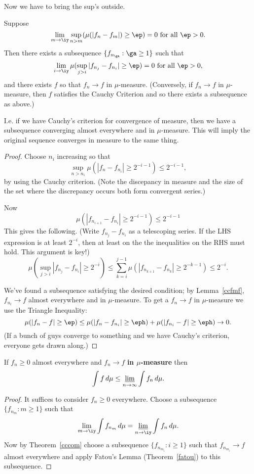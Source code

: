 Now we have to bring the sup's outside.
\begin{lem}\label{cccom}
Suppose 
\[
\lim_{m\to \iy}\sup_{n>m} (\mu(|f_n-f_m|)\ge \ep)=0\text{ for all }\ep>0.
\]
Then there exists a subsequence $\{f_{n_{\ga}}:\ga\ge 1\}$ such that
\[
\lim_{i\to \iy} \mu(\sup_{j>i} |f_{n_j}-f_{n_i}|\ge \ep)= 0\text{ for all }\ep>0,
\]
and there exists $f$ so that $f_n\to f$ in $\mu$-measure. (Conversely, if $f_n\to f$ in $\mu$-measure, then $f$ satisfies the Cauchy Criterion and so there exists a subsequence as above.)
\end{lem}
I.e. if we have Cauchy's criterion for convergence of measure, then we have a subsequence converging almost everywhere and in $\mu$-measure. This will imply the original sequence converges in measure to the same thing.
\begin{proof}
Choose $n_i$ increasing so that 
\[
\sup_{n>n_i} \mu( |f_n-f_{n_i}|\ge 2^{-i-1})\le 2^{-i-1},
\]
by using the Cauchy criterion. (Note the discepancy in measure and the size of the set where the discrepancy occurs both form convergent series.)

Now
\[
\mu(|f_{n_{i+1}}-f_{n_i}|\ge 2^{-i-1})\le 2^{-i-1}
\]
This gives the following. 
(Write $f_{n_j}-f_{n_i}$ as a telescoping series. If the LHS expression is at least $2^{-i}$, then at least on the the inequalities on the RHS must hold. This argument is key!)
\[
\mu(\sup_{j>i} |f_{n_j}-f_{n_i}|\ge 2^{-i})
\le \sum_{k=i}^{j-1}\mu(|f_{n_{k+1}}-f_{n_k}|\ge 2^{-k-1})\le 2^{-i}.
\]

We've found a subsequence satisfying the desired condition; by Lemma~\ref{ccfmf}, $f_{n_i}\to f$ almost everywhere and in $\mu$-measure. To get a $f_n\to f$ in $\mu$-measure we use the Triangle Inequality:
\[
\mu(|f_n-f|\ge \ep) \le \mu(|f_n-f_{n_i}|\ge \eph)+\mu(|f_{n_i}-f|\ge \eph)\to 0.
\]
(If a bunch of guys converge to something and we have Cauchy's criterion, everyone gets drawn along.)
\end{proof}

\begin{thm}[Fatou, v.2]
If $f_n\ge 0$ almost everywhere and $f_n\to f$ \textbf{in $\mu$-measure} then
\[
\int f\,d\mu\le \varliminf_{n\to \infty} \int f_n\,d\mu.
\]
\end{thm}
\begin{proof}
It suffices to consider $f_n\ge 0$ everywhere. Choose a subsequence $\{f_{n_m}:m\ge 1\}$ such that 
\[
\lim_{m\to \iy} \int f_{n_m}\,d\mu=\varliminf_{n\to \iy}\int f_n\,d\mu.
\]
Now by Theorem~\ref{cccom} choose a subsequence $\{f_{n_{m_i}}:i\ge 1\}$ such that $f_{n_{m_i}}\to f$ almost everywhere
 and apply Fatou's Lemma (Theorem~\ref{fatou}) to this subsequence.
\end{proof}


